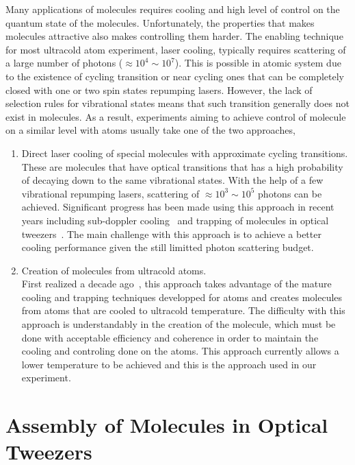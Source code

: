 Many applications of molecules requires cooling and high level of control
on the quantum state of the molecules.
Unfortunately, the properties that makes molecules attractive
also makes controlling them harder.
The enabling technique for most ultracold atom experiment, laser cooling,
typically requires scattering of a large number of photons ($\approx10^4\sim10^7$).
This is possible in atomic system due to the existence of cycling transition
or near cycling ones that can be completely closed with
one or two spin states repumping lasers.
However, the lack of selection rules for vibrational states means that
such transition generally does not exist in molecules.
As a result, experiments aiming to achieve control of molecule on a similar level with atoms
usually take one of the two approaches,
\begin{enumerate}
\item Direct laser cooling of special molecules
  with approximate cycling transitions.\\
  These are molecules that have optical transitions that has a high probability
  of decaying down to the same vibrational states.
  With the help of a few vibrational repumping lasers,
  scattering of $\approx10^3\sim10^5$ photons can be achieved.
  Significant progress has been made using this approach in recent years
  including sub-doppler cooling~\cite{cheuk_mathrmlambda-enhanced_2018}
  and trapping of molecules in optical tweezers~\cite{anderegg_optical_2019}.
  The main challenge with this approach is to achieve a better cooling performance
  given the still limitted photon scattering budget.
\item Creation of molecules from ultracold atoms.\\
  First realized a decade ago~\cite{ni_high_2008,lang_ultracold_2008},
  this approach takes advantage of the mature cooling and trapping techniques
  developped for atoms and creates molecules from atoms
  that are cooled to ultracold temperature.
  The difficulty with this approach is understandably in the creation of the molecule,
  which must be done with acceptable efficiency and coherence
  in order to maintain the cooling and controling done on the atoms.
  This approach currently allows a lower temperature to be achieved
  and this is the approach used in our experiment.
\end{enumerate}

\section{Assembly of Molecules in Optical Tweezers}
\label{ch:introduction:tweezers}

